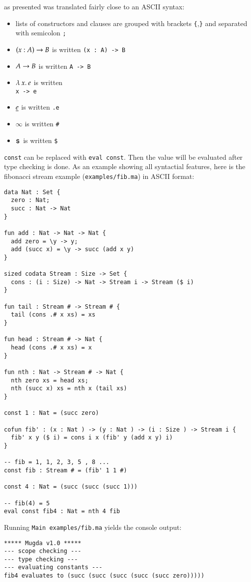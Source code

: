 \mugda as presented was translated fairly close to an ASCII syntax:
\begin{itemize}
\item
lists of constructors and clauses are grouped with brackets \texttt{\{},\texttt{\}} and separated with semicolon \texttt{;}
\item
$( x : A ) \rightarrow{B}$ is written \texttt{(x : A) -> B }
\item
$A \rightarrow B$ is written \texttt{A -> B}
\item
$ \lambda\: x .\:e$ is written \texttt{\\ x -> e }
\item
$ \underline{e}$ is written \texttt {.e} 
\item
$ \infty$ is written \texttt{\#} 
\item
$\mathsf{s}\,$ is written \texttt{\$}
\end{itemize}
\texttt{const} can be replaced with {\texttt {eval const}}. Then the value will be evaluated after type checking is done.
As an example showing all syntactial features, here is the fibonacci stream example (\texttt{examples/fib.ma}) in ASCII format:
\begin{verbatim}
data Nat : Set {
  zero : Nat;
  succ : Nat -> Nat 
}

fun add : Nat -> Nat -> Nat {
  add zero = \y -> y;
  add (succ x) = \y -> succ (add x y)
}

sized codata Stream : Size -> Set {
  cons : (i : Size) -> Nat -> Stream i -> Stream ($ i)
}
 
fun tail : Stream # -> Stream # {
  tail (cons .# x xs) = xs
}

fun head : Stream # -> Nat {
  head (cons .# x xs) = x
}

fun nth : Nat -> Stream # -> Nat {
  nth zero xs = head xs;
  nth (succ x) xs = nth x (tail xs) 
}

const 1 : Nat = (succ zero)

cofun fib' : (x : Nat ) -> (y : Nat ) -> (i : Size ) -> Stream i {
  fib' x y ($ i) = cons i x (fib' y (add x y) i)
} 

-- fib = 1, 1, 2, 3, 5 , 8 ...
const fib : Stream # = (fib' 1 1 #)

const 4 : Nat = (succ (succ (succ 1)))

-- fib(4) = 5 
eval const fib4 : Nat = nth 4 fib 
\end{verbatim}
Running \texttt{Main examples/fib.ma} yields the console output:
\begin{verbatim}
***** Mugda v1.0 *****
--- scope checking ---
--- type checking ---
--- evaluating constants ---
fib4 evaluates to (succ (succ (succ (succ (succ zero)))))
\end{verbatim}

